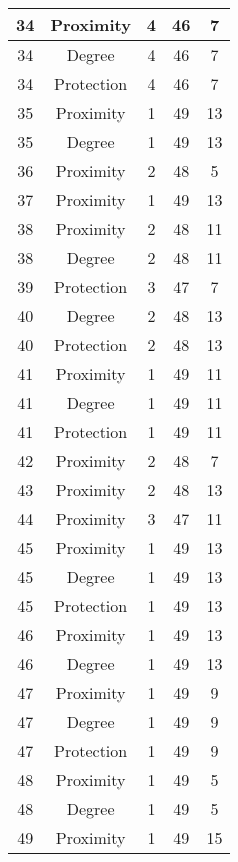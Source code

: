 \documentclass[results.tex]{subfiles}
\begin{document}
\begin{center}
\begin{tabular}{| c || c | c | c | c |}
    \hline
    34 & Proximity & 4 & 46 & 7 \\ 
    \hline
    34 & Degree & 4 & 46 & 7 \\ 
    \hline
    34 & Protection & 4 & 46 & 7 \\ 
    \hline
    35 & Proximity & 1 & 49 & 13 \\ 
    \hline
    35 & Degree & 1 & 49 & 13 \\ 
    \hline
    36 & Proximity & 2 & 48 & 5 \\ 
    \hline
    37 & Proximity & 1 & 49 & 13 \\ 
    \hline
    38 & Proximity & 2 & 48 & 11 \\ 
    \hline
    38 & Degree & 2 & 48 & 11 \\ 
    \hline
    39 & Protection & 3 & 47 & 7 \\ 
    \hline
    40 & Degree & 2 & 48 & 13 \\ 
    \hline
    40 & Protection & 2 & 48 & 13 \\ 
    \hline
    41 & Proximity & 1 & 49 & 11 \\ 
    \hline
    41 & Degree & 1 & 49 & 11 \\ 
    \hline
    41 & Protection & 1 & 49 & 11 \\ 
    \hline
    42 & Proximity & 2 & 48 & 7 \\ 
    \hline
    43 & Proximity & 2 & 48 & 13 \\ 
    \hline
    44 & Proximity & 3 & 47 & 11 \\ 
    \hline
    45 & Proximity & 1 & 49 & 13 \\ 
    \hline
    45 & Degree & 1 & 49 & 13 \\ 
    \hline
    45 & Protection & 1 & 49 & 13 \\ 
    \hline
    46 & Proximity & 1 & 49 & 13 \\ 
    \hline
    46 & Degree & 1 & 49 & 13 \\ 
    \hline
    47 & Proximity & 1 & 49 & 9 \\ 
    \hline
    47 & Degree & 1 & 49 & 9 \\ 
    \hline
    47 & Protection & 1 & 49 & 9 \\ 
    \hline
    48 & Proximity & 1 & 49 & 5 \\ 
    \hline
    48 & Degree & 1 & 49 & 5 \\ 
    \hline
    49 & Proximity & 1 & 49 & 15 \\ 
    \hline   \end{tabular}
\end{center}
\end{document}
